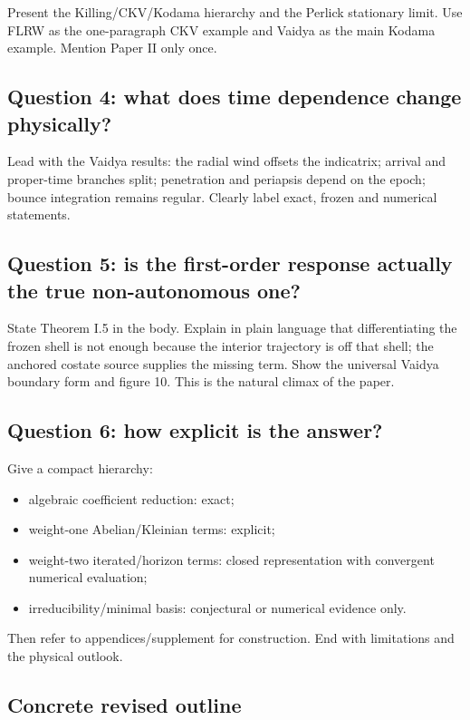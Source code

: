 \documentclass[11pt,a4paper]{article}
\begin{document}
Present the Killing/CKV/Kodama hierarchy and the Perlick stationary limit.  Use FLRW as the
one-paragraph CKV example and Vaidya as the main Kodama example.  Mention Paper II only once.

\subsection*{Question 4: what does time dependence change physically?}

Lead with the Vaidya results: the radial wind offsets the indicatrix; arrival and proper-time
branches split; penetration and periapsis depend on the epoch; bounce integration remains regular.
Clearly label exact, frozen and numerical statements.

\subsection*{Question 5: is the first-order response actually the true non-autonomous one?}

State Theorem I.5 in the body.  Explain in plain language that differentiating the frozen shell is
not enough because the interior trajectory is off that shell; the anchored costate source supplies
the missing term.  Show the universal Vaidya boundary form and figure 10.  This is the natural
climax of the paper.

\subsection*{Question 6: how explicit is the answer?}

Give a compact hierarchy:

\begin{itemize}
  \item algebraic coefficient reduction: exact;
  \item weight-one Abelian/Kleinian terms: explicit;
  \item weight-two iterated/horizon terms: closed representation with convergent numerical
  evaluation;
  \item irreducibility/minimal basis: conjectural or numerical evidence only.
\end{itemize}

Then refer to appendices/supplement for construction.  End with limitations and the physical
outlook.

\subsection{Concrete revised outline}
\end{document}
